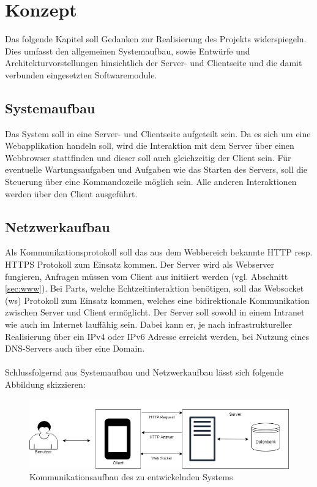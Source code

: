 \section{Konzept}\label{sec:konzept}
Das folgende Kapitel soll Gedanken zur Realisierung des Projekts widerspiegeln. 
Dies umfasst den allgemeinen Systemaufbau, sowie Entwürfe und Architekturvorstellungen hinsichtlich der Server- und Clientseite und die damit verbunden eingesetzten Softwaremodule.
\subsection{Systemaufbau}\label{sec:sysaufbau}
Das System soll in eine Server- und Clientseite aufgeteilt sein. 
Da es sich um eine Webapplikation handeln soll, wird die Interaktion mit dem Server über einen Webbrowser stattfinden und dieser soll auch gleichzeitig der Client sein. Für eventuelle Wartungsaufgaben und Aufgaben wie das Starten des Servers, soll die Steuerung über eine Kommandozeile möglich sein. Alle anderen Interaktionen werden über den Client ausgeführt.
\subsection{Netzwerkaufbau}\label{sec:netzwerkaufbau}
Als Kommunikationsprotokoll soll das aus dem Webbereich bekannte HTTP resp. HTTPS Protokoll zum Einsatz kommen. Der Server wird als Webserver fungieren, Anfragen müssen vom Client aus initiiert werden (vgl. Abschnitt \ref{sec:www}). Bei Parts, welche Echtzeitinteraktion benötigen, soll das Websocket (ws) Protokoll zum Einsatz kommen, welches eine bidirektionale Kommunikation zwischen Server und Client ermöglicht. Der Server soll sowohl in einem Intranet wie auch im Internet lauffähig sein. Dabei kann er, je nach infrastruktureller Realisierung über ein IPv4 oder IPv6 Adresse erreicht werden, bei Nutzung eines DNS-Servers auch über eine Domain.\\ \\
Schlussfolgernd aus Systemaufbau und Netzwerkaufbau lässt sich folgende Abbildung skizzieren:

\begin{figure}[H]
	\centering
	\includegraphics[width=0.8\linewidth]{bilder/server_diagram}
	\caption[Kommunikationsaufbau des zu entwickelnden Systems]{Kommunikationsaufbau des zu entwickelnden Systems}
	\label{fig:server_diagram}
\end{figure}


